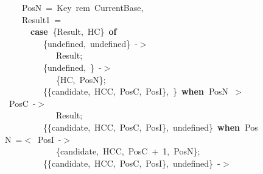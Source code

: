 \documentclass[runningheads,a4paper]{llncs}
\newcommand{\hlstd}[1]{\textcolor[rgb]{0,0,0}{#1}}
\newcommand{\hlnum}[1]{\textcolor[rgb]{0.69,0.49,0}{#1}}
\newcommand{\hlopt}[1]{\textcolor[rgb]{0,0,0}{#1}}
\newcommand{\hlkwa}[1]{\textcolor[rgb]{0,0,0}{\bf{#1}}}
\begin{document}
\begin{figure}
\hlstd{}\hlstd{\ \ \ \ }\hlstd{PosN\ }\hlopt{=\ }\hlstd{Key\ rem\ CurrentBase}\hlopt{,}\hspace*{\fill}\\
\hlstd{}\hlstd{\ \ \ \ }\hlstd{Result1\ }\hlopt{=}\hspace*{\fill}\\
\hlstd{}\hlstd{\ \ \ \ \ \ }\hlstd{}\hlkwa{case\ }\hlstd{}\hlopt{\{}\hlstd{Result}\hlopt{,\ }\hlstd{HC}\hlopt{\}\ }\hlstd{}\hlkwa{of}\hspace*{\fill}\\
\hlstd{}\hlstd{\ \ \ \ \ \ \ \ \ }\hlstd{}\hlopt{\{}\hlstd{undefined}\hlopt{,\ }\hlstd{undefined}\hlopt{\}\ {-}$>$}\hspace*{\fill}\\
\hlstd{}\hlstd{\ \ \ \ \ \ \ \ \ \ \ \ }\hlstd{Result}\hlopt{;}\hspace*{\fill}\\
\hlstd{}\hlstd{\ \ \ \ \ \ \ \ \ }\hlstd{}\hlopt{\{}\hlstd{undefined}\hlopt{,\ }\hlstd{\textunderscore }\hlopt{\}\ {-}$>$}\hspace*{\fill}\\
\hlstd{}\hlstd{\ \ \ \ \ \ \ \ \ \ \ \ }\hlstd{}\hlopt{\{}\hlstd{HC}\hlopt{,\ }\hlstd{PosN}\hlopt{\};}\hspace*{\fill}\\
\hlstd{}\hlstd{\ \ \ \ \ \ \ \ \ }\hlstd{}\hlopt{\{\{}\hlstd{candidate}\hlopt{,\ }\hlstd{\textunderscore HCC}\hlopt{,\ }\hlstd{PosC}\hlopt{,\ }\hlstd{\textunderscore PosI}\hlopt{\},\ }\hlstd{\textunderscore }\hlopt{\}\ }\hlstd{}\hlkwa{when\ }\hlstd{PosN\ }\hlopt{$>$\ }\hlstd{PosC\ }\hlopt{{-}$>$}\hspace*{\fill}\\
\hlstd{}\hlstd{\ \ \ \ \ \ \ \ \ \ \ \ }\hlstd{Result}\hlopt{;}\hspace*{\fill}\\
\hlstd{}\hlstd{\ \ \ \ \ \ \ \ \ }\hlstd{}\hlopt{\{\{}\hlstd{candidate}\hlopt{,\ }\hlstd{HCC}\hlopt{,\ }\hlstd{PosC}\hlopt{,\ }\hlstd{PosI}\hlopt{\},\ }\hlstd{undefined}\hlopt{\}\ }\hlstd{}\hlkwa{when\ }\hlstd{PosN\ }\hlopt{=$<$\ }\hlstd{PosI\ }\hlopt{{-}$>$}\hspace*{\fill}\\
\hlstd{}\hlstd{\ \ \ \ \ \ \ \ \ \ \ \ }\hlstd{}\hlopt{\{}\hlstd{candidate}\hlopt{,\ }\hlstd{HCC}\hlopt{,\ }\hlstd{PosC\ }\hlopt{+\ }\hlstd{}\hlnum{1}\hlstd{}\hlopt{,\ }\hlstd{PosN}\hlopt{\};}\hspace*{\fill}\\
\hlstd{}\hlstd{\ \ \ \ \ \ \ \ \ }\hlstd{}\hlopt{\{\{}\hlstd{candidate}\hlopt{,\ }\hlstd{HCC}\hlopt{,\ }\hlstd{PosC}\hlopt{,\ }\hlstd{PosI}\hlopt{\},\ }\hlstd{undefined}\hlopt{\}\ {-}$>$}\hspace*{\fill}\\

\end{figure}
\end{document}
